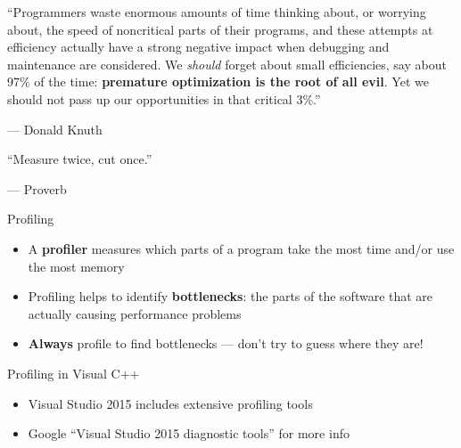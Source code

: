 \begin{frame}
	\begin{center}
		``Programmers waste enormous amounts of time thinking about, or worrying about,
		the speed of noncritical parts of their programs, and these attempts at efficiency
		actually have a strong negative impact when debugging and maintenance are considered.
		We \textit{should} forget about small efficiencies, say about 97\% of the time:
		\textbf{premature optimization is the root of all evil}.
		Yet we should not pass up our opportunities in that critical 3\%.''
	\end{center}
	\begin{flushright}
		--- Donald Knuth
	\end{flushright}
\end{frame}

\begin{frame}
	\begin{center}
		``Measure twice, cut once.''
	\end{center}
	\begin{flushright}
		--- Proverb
	\end{flushright}
\end{frame}

\begin{frame}{Profiling}
	\begin{itemize}
		\item A \textbf{profiler} measures which parts of a program take the most time
			and/or use the most memory \pause
		\item Profiling helps to identify \textbf{bottlenecks}:
			the parts of the software that are actually causing performance problems \pause
		\item \textbf{Always} profile to find bottlenecks --- don't try to guess where they are!
	\end{itemize}
\end{frame}

\begin{frame}{Profiling in Visual C++}
	\begin{itemize}
		\item Visual Studio 2015 includes extensive profiling tools \pause
		\item Google ``Visual Studio 2015 diagnostic tools'' for more info
	\end{itemize}
\end{frame}

